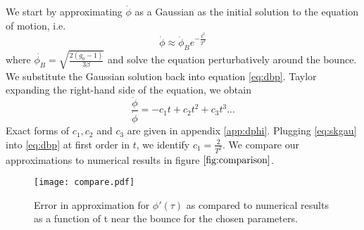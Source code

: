\documentclass[12pt,a4paper]{article}
\numberwithin{equation}{section}
\numberwithin{equation}{section}
\begin{document}
We start by approximating $\dot{\phi}$ as a Gaussian as the initial solution to the equation of motion, i.e.
\begin{equation}
    \dot{\phi} \approx \dot{\phi}_B e^{-\frac{t^2}{T^2}} 
    \label{eq:skgau}
\end{equation}
where $\dot{\phi_B} = \sqrt{\frac{2(g_0-1)}{3 \beta}}$
and solve the equation perturbatively around the bounce.
We substitute the Gaussian solution back into equation
\eqref{eq:dbp}. Taylor expanding the right-hand side of the equation, we obtain
\begin{equation}
    \frac{\ddot{\phi}}{\dot{\phi}} = -c_1 t + c_2 t^2 + c_3 t^3...
\end{equation}
Exact forms of $c_1,c_2$ and $c_3$ are given in appendix \ref{app:dphi}. 
Plugging \eqref{eq:skgau} into \eqref{eq:dbp} at first order in $t$, we identify $c_1=\frac{2}{T^2}$. %
We compare our approximations to numerical results in figure $\ref{fig:comparison}$.
\begin{figure}[H]
    \centering
    \texttt{[image: compare.pdf]} 
     \caption{ Error in approximation for $\phi'(\tau)$ as compared to numerical results as a function of t  near the bounce for the chosen parameters. } 
 \label{fig:comparison}
\end{figure} 
\end{document}
